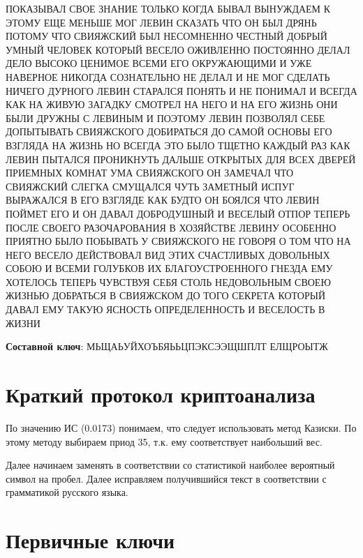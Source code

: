 \documentclass[12pt, a4paper] {ncc}
\begin{document}
ПОКАЗЫВАЛ СВОЕ ЗНАНИЕ ТОЛЬКО КОГДА БЫВАЛ ВЫНУЖДАЕМ К ЭТОМУ ЕЩЕ МЕНЬШЕ МОГ ЛЕВИН СКАЗАТЬ ЧТО ОН БЫЛ ДРЯНЬ ПОТОМУ ЧТО СВИЯЖСКИЙ БЫЛ НЕСОМНЕННО ЧЕСТНЫЙ ДОБРЫЙ УМНЫЙ ЧЕЛОВЕК КОТОРЫЙ ВЕСЕЛО ОЖИВЛЕННО ПОСТОЯННО ДЕЛАЛ ДЕЛО ВЫСОКО ЦЕНИМОЕ ВСЕМИ ЕГО ОКРУЖАЮЩИМИ И УЖЕ НАВЕРНОЕ НИКОГДА СОЗНАТЕЛЬНО НЕ ДЕЛАЛ И НЕ МОГ СДЕЛАТЬ НИЧЕГО ДУРНОГО ЛЕВИН СТАРАЛСЯ ПОНЯТЬ И НЕ ПОНИМАЛ И ВСЕГДА КАК НА ЖИВУЮ ЗАГАДКУ СМОТРЕЛ НА НЕГО И НА ЕГО ЖИЗНЬ ОНИ БЫЛИ ДРУЖНЫ С ЛЕВИНЫМ И ПОЭТОМУ ЛЕВИН ПОЗВОЛЯЛ СЕБЕ ДОПЫТЫВАТЬ СВИЯЖСКОГО ДОБИРАТЬСЯ ДО САМОЙ ОСНОВЫ ЕГО ВЗГЛЯДА НА ЖИЗНЬ НО ВСЕГДА ЭТО БЫЛО ТЩЕТНО КАЖДЫЙ РАЗ КАК ЛЕВИН ПЫТАЛСЯ ПРОНИКНУТЬ ДАЛЬШЕ ОТКРЫТЫХ ДЛЯ ВСЕХ ДВЕРЕЙ ПРИЕМНЫХ КОМНАТ УМА СВИЯЖСКОГО ОН ЗАМЕЧАЛ ЧТО СВИЯЖСКИЙ СЛЕГКА СМУЩАЛСЯ ЧУТЬ ЗАМЕТНЫЙ ИСПУГ ВЫРАЖАЛСЯ В ЕГО ВЗГЛЯДЕ КАК БУДТО ОН БОЯЛСЯ ЧТО ЛЕВИН ПОЙМЕТ ЕГО И ОН ДАВАЛ ДОБРОДУШНЫЙ И ВЕСЕЛЫЙ ОТПОР ТЕПЕРЬ ПОСЛЕ СВОЕГО РАЗОЧАРОВАНИЯ В ХОЗЯЙСТВЕ ЛЕВИНУ ОСОБЕННО ПРИЯТНО БЫЛО ПОБЫВАТЬ У СВИЯЖСКОГО НЕ ГОВОРЯ О ТОМ ЧТО НА НЕГО ВЕСЕЛО ДЕЙСТВОВАЛ ВИД ЭТИХ СЧАСТЛИВЫХ ДОВОЛЬНЫХ СОБОЮ И ВСЕМИ ГОЛУБКОВ ИХ БЛАГОУСТРОЕННОГО ГНЕЗДА ЕМУ ХОТЕЛОСЬ ТЕПЕРЬ ЧУВСТВУЯ СЕБЯ СТОЛЬ НЕДОВОЛЬНЫМ СВОЕЮ ЖИЗНЬЮ ДОБРАТЬСЯ В СВИЯЖСКОМ ДО ТОГО СЕКРЕТА КОТОРЫЙ ДАВАЛ ЕМУ ТАКУЮ ЯСНОСТЬ ОПРЕДЕЛЕННОСТЬ И ВЕСЕЛОСТЬ В ЖИЗНИ

\textbf{Составной ключ}:
МЬЩАЬУЙХОЪБЯЬЬЦПЭКСЭЭЩШПЛТ ЕЛЩРОЫТЖ

\section{Краткий протокол криптоанализа}
	По значению ИС (0.0173) понимаем, что следует использовать метод Казиски. По этому методу выбираем приод 35, т.к. ему
	соответствует наибольший вес.

	Далее начинаем заменять в соответствии со статистикой наиболее вероятный символ на пробел. Далее исправляем получившийся текст
	в соответствии с грамматикой русского языка. 

\section{Первичные ключи}
\end{document}
